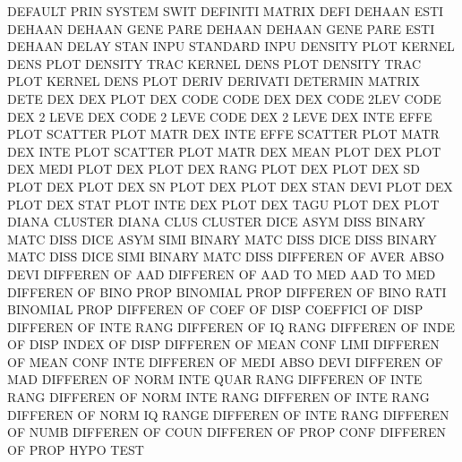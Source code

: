 DEFAULT  PRIN                           SYSTEM   SWIT
DEFINITI                                MATRIX   DEFI
DEHAAN   ESTI                           DEHAAN
DEHAAN   GENE PARE                      DEHAAN
DEHAAN   GENE PARE ESTI                 DEHAAN
DELAY    STAN INPU                      STANDARD INPU
DENSITY  PLOT                           KERNEL   DENS PLOT
DENSITY  TRAC                           KERNEL   DENS PLOT
DENSITY  TRAC PLOT                      KERNEL   DENS PLOT
DERIV                                   DERIVATI
DETERMIN                                MATRIX   DETE
DEX                                     DEX      PLOT
DEX      CODE                           CODE     DEX
DEX      CODE 2LEV                      CODE     DEX  2    LEVE
DEX      CODE 2    LEVE                 CODE     DEX  2    LEVE
DEX      INTE EFFE PLOT                 SCATTER  PLOT MATR
DEX      INTE EFFE                      SCATTER  PLOT MATR
DEX      INTE PLOT                      SCATTER  PLOT MATR
DEX      MEAN PLOT                      DEX      PLOT
DEX      MEDI PLOT                      DEX      PLOT
DEX      RANG PLOT                      DEX      PLOT
DEX      SD   PLOT                      DEX      PLOT
DEX      SN   PLOT                      DEX      PLOT
DEX      STAN DEVI PLOT                 DEX      PLOT
DEX      STAT PLOT INTE                 DEX      PLOT
DEX      TAGU PLOT                      DEX      PLOT
DIANA                                   CLUSTER
DIANA    CLUS                           CLUSTER
DICE     ASYM DISS                      BINARY   MATC DISS
DICE     ASYM SIMI                      BINARY   MATC DISS
DICE     DISS                           BINARY   MATC DISS
DICE     SIMI                           BINARY   MATC DISS
DIFFEREN OF   AVER ABSO DEVI            DIFFEREN OF   AAD
DIFFEREN OF   AAD  TO   MED             AAD      TO   MED
DIFFEREN OF   BINO PROP                 BINOMIAL PROP
DIFFEREN OF   BINO RATI                 BINOMIAL PROP
DIFFEREN OF   COEF OF   DISP            COEFFICI OF   DISP
DIFFEREN OF   INTE RANG                 DIFFEREN OF   IQ   RANG
DIFFEREN OF   INDE OF   DISP            INDEX    OF   DISP
DIFFEREN OF   MEAN CONF LIMI            DIFFEREN OF   MEAN CONF INTE
DIFFEREN OF   MEDI ABSO DEVI            DIFFEREN OF   MAD
DIFFEREN OF   NORM INTE QUAR RANG       DIFFEREN OF   INTE RANG
DIFFEREN OF   NORM INTE RANG            DIFFEREN OF   INTE RANG
DIFFEREN OF   NORM IQ   RANGE           DIFFEREN OF   INTE RANG
DIFFEREN OF   NUMB                      DIFFEREN OF   COUN
DIFFEREN OF   PROP CONF                 DIFFEREN OF   PROP HYPO TEST
